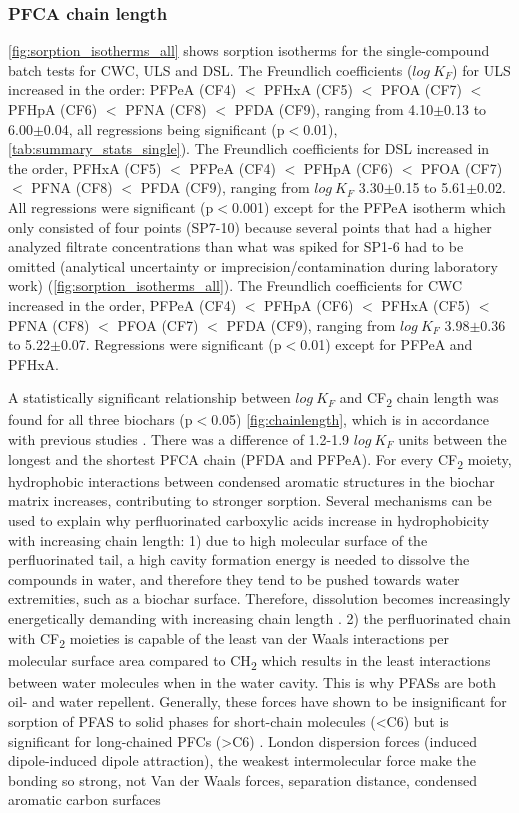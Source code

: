 \subsubsection{PFCA chain length}
\cref{fig:sorption_isotherms_all} shows sorption isotherms for the single-compound batch tests for CWC, ULS and DSL. The Freundlich coefficients ($log~K_F$) for ULS increased in the order: PFPeA (CF4) $<$ PFHxA (CF5) $<$ PFOA (CF7) $<$ PFHpA (CF6) $<$ PFNA (CF8) $<$ PFDA (CF9), ranging from 4.10$\pm$0.13 to 6.00$\pm$0.04, all regressions being significant (p$<$0.01), \cref{tab:summary_stats_single}). The Freundlich coefficients for DSL increased in the order, PFHxA (CF5) $<$ PFPeA (CF4) $<$ PFHpA (CF6) $<$ PFOA (CF7) $<$ PFNA (CF8) $<$ PFDA (CF9), ranging from $log~K_F$ 3.30$\pm$0.15 to 5.61$\pm$0.02. All regressions were significant (p$<$0.001) except for the PFPeA isotherm which only consisted of four points (SP7-10) because several points that had a higher analyzed filtrate concentrations than what was spiked for SP1-6 had to be omitted (analytical uncertainty or imprecision/contamination during laboratory work) (\cref{fig:sorption_isotherms_all}). The Freundlich coefficients for CWC increased in the order, PFPeA (CF4) $<$ PFHpA (CF6) $<$ PFHxA (CF5) $<$ PFNA (CF8) $<$ PFOA (CF7) $<$ PFDA (CF9), ranging from $log~K_F$ 3.98$\pm$0.36 to 5.22$\pm$0.07. Regressions were significant (p$<$0.01) except for PFPeA and PFHxA. 

A statistically significant relationship between $log~K_F$ and CF\textsubscript{2} chain length was found for all three biochars (p$<$0.05) \cref{fig:chainlength}, which is in accordance with previous studies \citep{Sorengard2019, higgins2006sorption, ahmed2020per}. There was a difference of 1.2-1.9 $log~K_F$ units between the longest and the shortest PFCA chain (PFDA and PFPeA). For every CF\textsubscript{2} moiety, hydrophobic interactions between condensed aromatic structures in the biochar matrix increases, contributing to stronger sorption. Several mechanisms can be used to explain why perfluorinated carboxylic acids increase in hydrophobicity with increasing chain length: 1) due to high molecular surface of the perfluorinated tail, a high cavity formation energy is needed to dissolve the compounds in water, and therefore they tend to be pushed towards water extremities, such as a biochar surface. Therefore, dissolution becomes increasingly energetically demanding with increasing chain length \citep{sigmund2022sorption}. 2) the perfluorinated chain with CF\textsubscript{2} moieties is capable of the least van der Waals interactions per molecular surface area compared to CH\textsubscript{2} which results in the least interactions between water molecules when in the water cavity. This is why PFASs are both oil- and water repellent.  Generally, these forces have shown to be insignificant for sorption of PFAS to solid phases for short-chain molecules (\textless C6) but is significant for long-chained PFCs (\textgreater C6) \citep{du2014adsorption}.
London dispersion forces (induced dipole-induced dipole attraction), the weakest intermolecular force make the bonding so strong, not Van der Waals forces,  separation distance, condensed aromatic carbon surfaces \citep{Cornelissen2005}

